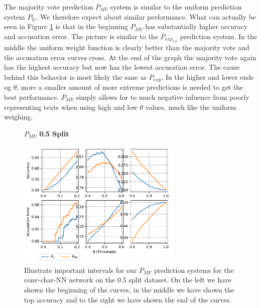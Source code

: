 \begin{description}
        The majority vote prediction $P_{MV}$ system is similar to the
        uniform prediction system $P_{\mathcal{U}}$. We therefore expect
        about similar performance. What can actually be seen in Figure
        \ref{fig:conv_char_prediction_zoom_50_majority_vote} is that in the
        beginning $P_{MV}$ has substantially higher accuracy and accusation
        error. The picture is similar to the $P_{exp_{1.0}}$ prediction system.
        In the middle the uniform weight function is clearly better than the
        majority vote and the accusation error curves cross. At the end of the
        graph the majority vote again has the highest accuracy but now has the
        lowest accusation error. The cause behind this behavior is most likely
        the sane as $P_{exp}$. In the higher and lower ends og $\theta$, more
        a smaller amount of more extreme predictions is needed to get the best
        performance. $P_{MV}$ simply allows for to much negative infuence from
        poorly representing texts when using high and low $\theta$ values,
        much like the uniform weighing.


        \begin{figure}
            \centering
            \textbf{$P_{MV}$ 0.5 Split}\par\medskip
            \includegraphics[width=0.7\textwidth]{./pictures/discussion/conv_char_nn_prediction_zoom_50_majority_vote}
            \caption{Illustrate important intervals for our $P_{MV}$ prediction
                systems for the \gls{conv-char-NN} network on the 0.5 split
                dataset. On the left we have shown the beginning of the curves,
                in the middle we have shown the top accuracy and to the right we
                have shown the end of the curves.}
            \label{fig:conv_char_prediction_zoom_50_majority_vote}
        \end{figure}

\end{description}


